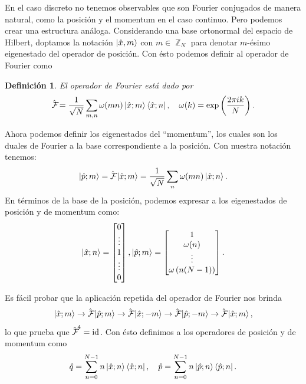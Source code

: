 \documentclass[a4paper]{report}
\DeclareMathOperator{\Z}{\mathbb{Z}}
\let\H\relax
\DeclareMathOperator{\H}{\mathcal H}
\DeclareMathOperator{\id}{id}
\DeclareMathOperator{\Fr}{\mathcal{F}\!}
\newtheorem{definition}{Definición}
\begin{document}
  En el caso discreto no tenemos observables que son Fourier
  conjugados de manera natural, como la posición y el
  momentum en el caso continuo. Pero podemos crear una
  estructura análoga. Considerando una base ortonormal del
  espacio de Hilbert, doptamos la notación $\ket{\hat{x},
  m}$ con $m \in \Z_N$ para denotar $m$-ésimo eigenestado
  del operador de posición. Con ésto podemos definir al
  operador de Fourier como
  \begin{definition}
    El operador de Fourier está dado por
    \begin{equation}
     \hat{\Fr}
     = \frac{1}{\sqrt{N}} 
     \sum_{m,n}^{} \omega(mn) \ket{\hat{x}; m} \bra{\hat{x};
     n},
     \quad \omega(k)
     = \exp \left( \frac{2\pi i k}{N} \right).
    \end{equation}
  \end{definition}
  Ahora podemos definir los eigenestados del ``momentum'',
  los cuales son los duales de Fourier a la base
  correspondiente a la posición. Con nuestra notación
  tenemos:
  \begin{equation}
    \ket{\hat{p}; m}
    =\hat{\Fr} \ket{\hat{x}; m}
    = \frac{1}{\sqrt{N}} \sum_{n}^{} \omega(mn)
    \ket{\hat{x};n}.
  \end{equation}
  En términos de la base de la posición, podemos expresar a
  los eigenestados de posición y de momentum como:
  \begin{equation}
    \ket{\hat{x};n}
    = \begin{bmatrix}
      0 \\
      \vdots \\
      1 \\
      \vdots \\
      0
    \end{bmatrix},
    \ket{\hat{p};m}
    = \begin{bmatrix}
      1 \\
      \omega(n) \\
      \vdots \\
      \omega\left( n(N-1) \right) 
    \end{bmatrix}.
  \end{equation}

  Es fácil probar que la aplicación repetida del operador de
  Fourier nos brinda
  \[
    \ket{\hat{x};m}
    \rightarrow{\hat{\Fr}}
    \ket{\hat{p};m}
    \rightarrow{\hat{\Fr}}
    \ket{\hat{x};-m}
    \rightarrow{\hat{\Fr}}
    \ket{\hat{p};-m}
    \rightarrow{\hat{\Fr}}
    \ket{\hat{x};m},
  \] 
  lo que prueba que $\hat{\Fr}^{4} = \id_{\H}$. Con ésto
  definimos a los operadores de posición y de momentum como
  \begin{equation}
    \hat{q}
    = \sum_{n=0}^{N-1} n \ket{\hat{x};n} \bra{\hat{x};n},
    \quad
    \hat{p}
    = \sum_{n=0}^{N-1} n \ket{\hat{p};n} \bra{\hat{p};n}.
  \end{equation}
\end{document}
